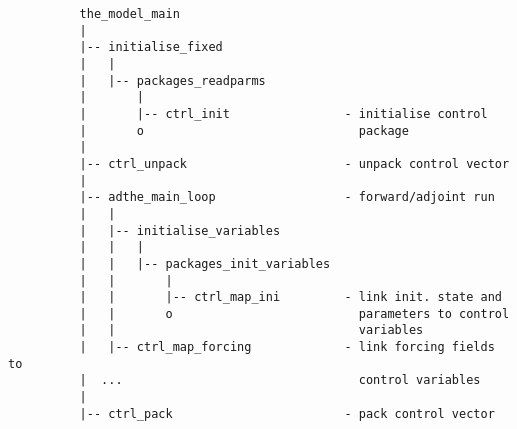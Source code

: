 
{\scriptsize
\begin{verbatim}
          the_model_main
          |
          |-- initialise_fixed
          |   |
          |   |-- packages_readparms
          |       |
          |       |-- ctrl_init                - initialise control
          |       o                              package
          |
          |-- ctrl_unpack                      - unpack control vector
          |
          |-- adthe_main_loop                  - forward/adjoint run
          |   |
          |   |-- initialise_variables
          |   |   |
          |   |   |-- packages_init_variables
          |   |       |
          |   |       |-- ctrl_map_ini         - link init. state and
          |   |       o                          parameters to control 
          |   |                                  variables
          |   |-- ctrl_map_forcing             - link forcing fields to
          |  ...                                 control variables
          |
          |-- ctrl_pack                        - pack control vector
\end{verbatim}
}
